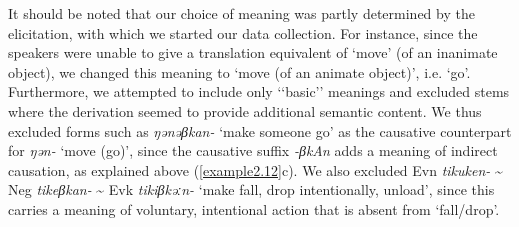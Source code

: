 \documentclass[output=paper,colorlinks,citecolor=brown]{langscibook}
\begin{document}
It should be noted that our choice of meaning was partly determined by the  elicitation, with which we started our data collection. For instance, since the speakers were unable to give a translation equivalent of ‘move’ (of an inanimate object), we changed this meaning to ‘move (of an animate object)’, i.e. ‘go’. Furthermore, we attempted to include only ‘‘basic’’ meanings and excluded stems where the derivation seemed to provide additional semantic content. We thus excluded forms such as  \textit{ŋənəβkan-} ‘make someone go’ as the causative counterpart for \textit{ŋən-} ‘move (go)’, since the causative suffix \textit{-βkAn} adds a meaning of indirect causation, as explained above (\ref{example2.12}c). We also excluded Evn \textit{tikuken-} {\textasciitilde} Neg \textit{tikeβkan-} {\textasciitilde} Evk \textit{tikiβkəːn-} ‘make fall, drop intentionally, unload’, since this carries a meaning of voluntary, intentional action that is absent from ‘fall/drop’.
\end{document}
